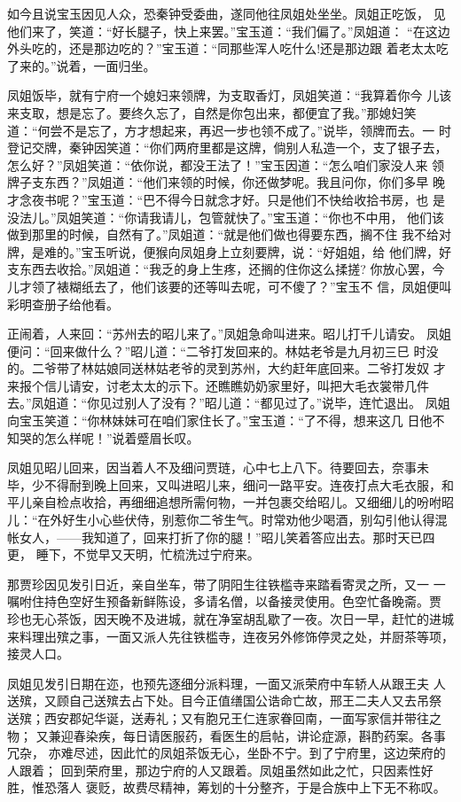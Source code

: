 如今且说宝玉因见人众，恐秦钟受委曲，遂同他往凤姐处坐坐。凤姐正吃饭，
见他们来了，笑道：“好长腿子，快上来罢。”宝玉道：“我们偏了。”凤姐道：
“在这边外头吃的，还是那边吃的？”宝玉道：“同那些浑人吃什么!还是那边跟
着老太太吃了来的。”说着，一面归坐。

凤姐饭毕，就有宁府一个媳妇来领牌，为支取香灯，凤姐笑道：“我算着你今
儿该来支取，想是忘了。要终久忘了，自然是你包出来，都便宜了我。”那媳妇笑
道：“何尝不是忘了，方才想起来，再迟一步也领不成了。”说毕，领牌而去。一
时登记交牌，秦钟因笑道：“你们两府里都是这牌，倘别人私造一个，支了银子去，
怎么好？”凤姐笑道：“依你说，都没王法了！”宝玉因道：“怎么咱们家没人来
领牌子支东西？”凤姐道：“他们来领的时候，你还做梦呢。我且问你，你们多早
晚才念夜书呢？”宝玉道：“巴不得今日就念才好。只是他们不快给收拾书房，也
是没法儿。”凤姐笑道：“你请我请儿，包管就快了。”宝玉道：“你也不中用，
他们该做到那里的时候，自然有了。”凤姐道：“就是他们做也得要东西，搁不住
我不给对牌，是难的。”宝玉听说，便猴向凤姐身上立刻要牌，说：“好姐姐，给
他们牌，好支东西去收拾。”凤姐道：“我乏的身上生疼，还搁的住你这么揉搓?
你放心罢，今儿才领了裱糊纸去了，他们该要的还等叫去呢，可不傻了？”宝玉不
信，凤姐便叫彩明查册子给他看。

正闹着，人来回：“苏州去的昭儿来了。”凤姐急命叫进来。昭儿打千儿请安。
凤姐便问：“回来做什么？”昭儿道：“二爷打发回来的。林姑老爷是九月初三巳
时没的。二爷带了林姑娘同送林姑老爷的灵到苏州，大约赶年底回来。二爷打发奴
才来报个信儿请安，讨老太太的示下。还瞧瞧奶奶家里好，叫把大毛衣裳带几件
去。”凤姐道：“你见过别人了没有？”昭儿道：“都见过了。”说毕，连忙退出。
凤姐向宝玉笑道：“你林妹妹可在咱们家住长了。”宝玉道：“了不得，想来这几
日他不知哭的怎么样呢！”说着蹙眉长叹。

凤姐见昭儿回来，因当着人不及细问贾琏，心中七上八下。待要回去，奈事未
毕，少不得耐到晚上回来，又叫进昭儿来，细问一路平安。连夜打点大毛衣服，和
平儿亲自检点收拾，再细细追想所需何物，一并包裹交给昭儿。又细细儿的吩咐昭
儿：“在外好生小心些伏侍，别惹你二爷生气。时常劝他少喝酒，别勾引他认得混
帐女人，——我知道了，回来打折了你的腿！”昭儿笑着答应出去。那时天已四更，
睡下，不觉早又天明，忙梳洗过宁府来。

那贾珍因见发引日近，亲自坐车，带了阴阳生往铁槛寺来踏看寄灵之所，又一
一嘱咐住持色空好生预备新鲜陈设，多请名僧，以备接灵使用。色空忙备晚斋。贾
珍也无心茶饭，因天晚不及进城，就在净室胡乱歇了一夜。次日一早，赶忙的进城
来料理出殡之事，一面又派人先往铁槛寺，连夜另外修饰停灵之处，并厨茶等项，
接灵人口。

凤姐见发引日期在迩，也预先逐细分派料理，一面又派荣府中车轿人从跟王夫
人送殡，又顾自己送殡去占下处。目今正值缮国公诰命亡故，邢王二夫人又去吊祭
送殡；西安郡妃华诞，送寿礼；又有胞兄王仁连家眷回南，一面写家信并带往之物；
又兼迎春染疾，每日请医服药，看医生的启帖，讲论症源，斟酌药案。各事冗杂，
亦难尽述，因此忙的凤姐茶饭无心，坐卧不宁。到了宁府里，这边荣府的人跟着；
回到荣府里，那边宁府的人又跟着。凤姐虽然如此之忙，只因素性好胜，惟恐落人
褒贬，故费尽精神，筹划的十分整齐，于是合族中上下无不称叹。

